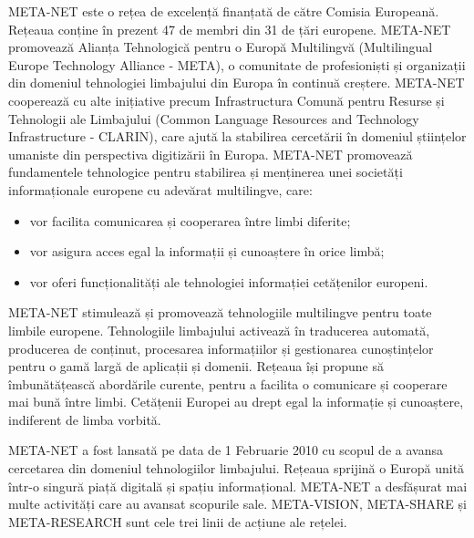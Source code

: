 \documentclass[]{../../metanetpaper}
\begin{document}
\cleardoublepage



\begin{multicols}{2}

META-NET este o rețea de excelență finanțată de către Comisia Europeană. Rețeaua conține în prezent 47 de membri din 31 de țări europene. META-NET promovează Alianța Tehnologică pentru o Europă Multilingvă (Multilingual Europe Technology Alliance - META), o comunitate de profesioniști și organizații din domeniul tehnologiei limbajului din Europa în continuă creștere. META-NET cooperează cu alte inițiative precum Infrastructura Comună pentru Resurse și Tehnologii ale Limbajului (Common Language Resources and Technology Infrastructure - CLARIN), care ajută la stabilirea cercetării în domeniul științelor umaniste din perspectiva digitizării în Europa. META-NET promovează fundamentele tehnologice pentru stabilirea și menținerea unei societăți informaționale europene cu adevărat multilingve, care:

\begin{itemize}
\item vor facilita comunicarea și cooperarea între limbi diferite;
\item vor asigura acces egal la informații și cunoaștere în orice limbă;
\item vor oferi funcționalități ale tehnologiei informației cetățenilor europeni.
\end{itemize}

META-NET stimulează și promovează tehnologiile multilingve pentru toate limbile europene. Tehnologiile limbajului activează în traducerea automată, producerea de conținut, procesarea informațiilor și gestionarea cunoștințelor pentru o gamă largă de aplicații și domenii. Rețeaua își propune să îmbunătățească abordările curente, pentru a facilita o comunicare și cooperare mai bună între limbi. Cetățenii Europei au drept egal la informație și cunoaștere, indiferent de limba vorbită.

META-NET a fost lansată pe data de 1 Februarie 2010 cu scopul de a avansa cercetarea din domeniul tehnologiilor limbajului. Rețeaua sprijină o Europă unită într-o singură piață digitală și spațiu informațional. META-NET a desfășurat mai multe activități care au avansat scopurile sale. META-VISION, META-SHARE și META-RESEARCH sunt cele trei linii de acțiune ale rețelei.


\end{multicols}
\end{document}
